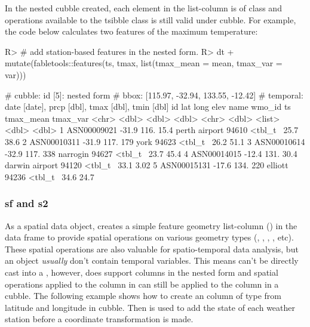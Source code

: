 \documentclass[
]{jss}
\begin{document}
In the nested cubble created, each element in the list-column 
is of  class and operations available to the tsibble class
is still valid under cubble. For example, the code below calculates two
features of the maximum temperature:

\begin{CodeChunk}
\begin{CodeInput}
R> # add station-based features in the nested form.
R> dt %
+   mutate(fabletools::features(ts, tmax, list(tmax_mean = mean, tmax_var = var)))
\end{CodeInput}
\begin{CodeOutput}
# cubble:   id [5]: nested form
# bbox:     [115.97, -32.94, 133.55, -12.42]
# temporal: date [date], prcp [dbl], tmax [dbl], tmin [dbl]
  id            lat  long  elev name           wmo_id ts      tmax_mean tmax_var
  <chr>       <dbl> <dbl> <dbl> <chr>           <dbl> <list>      <dbl>    <dbl>
1 ASN00009021 -31.9  116.  15.4 perth airport   94610 <tbl_t~      25.7    38.6 
2 ASN00010311 -31.9  117. 179   york            94623 <tbl_t~      26.2    51.1 
3 ASN00010614 -32.9  117. 338   narrogin        94627 <tbl_t~      23.7    45.4 
4 ASN00014015 -12.4  131.  30.4 darwin airport  94120 <tbl_t~      33.1     3.02
5 ASN00015131 -17.6  134. 220   elliott         94236 <tbl_t~      34.6    24.7 
\end{CodeOutput}
\end{CodeChunk}

\hypertarget{sf-and-s2}{%
\subsubsection{sf and s2}\label{sf-and-s2}}

As a spatial data object,  creates a simple feature geometry
list-column () in the data frame to provide spatial operations
on various geometry types (, ,
, , etc). These spatial operations are
also valuable for spatio-temporal data analysis, but an  object
\emph{usually} don't contain temporal variables. This means 
can't be directly cast into a , however,  does
support  columns in the nested form and spatial operations
applied to the  column in  can still be applied to
the  column in a cubble. The following example shows how to
create an  column of  type from latitude and
longitude in cubble. Then  is used to add the state
 of each weather station before a coordinate
transformation is made.
\end{document}

